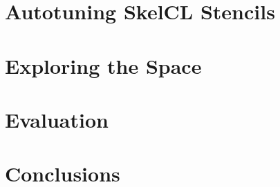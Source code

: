\chapter{Autotuning SkelCL Stencils}\label{chap:omnitune-skelcl}



%

\chapter{Exploring the Space}\label{chap:methodology}


%

\chapter{Evaluation}\label{chap:evaluation}



%
\chapter{Conclusions}\label{chap:conclusions}



\clearpage
\label{bibliography}
\printbibliography


